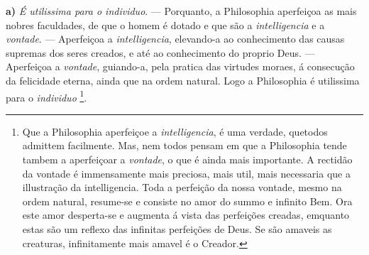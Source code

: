 \textbf{a)} \emph{É utilissima para o individuo}. --- Porquanto, a Philosophia aperfeiçoa as mais nobres faculdades, de que o homem é dotado e que são a \emph{intelligencia} e a \emph{vontade}. --- Aperfeiçoa a \emph{intelligencia}, elevando-a ao conhecimento das causas supremas dos seres creados, e até ao conhecimento do proprio Deus. --- Aperfeiçoa a \emph{vontade}, guiando-a, pela pratica das virtudes moraes, á consecução da felicidade eterna, ainda que na ordem natural. Logo a Philosophia é utilissima para o \emph{individuo} \footnote{Que a Philosophia aperfeiçoe a \emph{intelligencia}, é uma verdade, quetodos admittem facilmente. Mas, nem todos pensam em que a Philosophia tende tambem a aperfeiçoar a \emph{vontade}, o que é ainda mais importante. A rectidão da vontade é immensamente mais preciosa, mais util, mais necessaria que a illustração da intelligencia. Toda a perfeição da nossa vontade, mesmo na ordem natural, resume-se e consiste no amor do summo e infinito Bem. Ora este amor desperta-se e augmenta á vista das perfeições creadas, emquanto estas são um reflexo das infinitas perfeições de Deus. Se são amaveis as creaturas, infinitamente mais amavel é o Creador.}.

